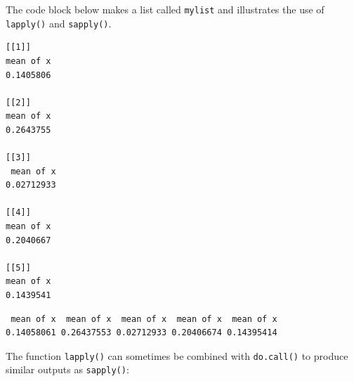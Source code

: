 \documentclass[
  13,
  letterpaper,
]{report}
\newenvironment{Shaded}{\begin{snugshade}}{\end{snugshade}}
\newcommand{\CommentTok}[1]{\textcolor[rgb]{0.37,0.37,0.37}{#1}}
\newcommand{\ControlFlowTok}[1]{\textcolor[rgb]{0.00,0.23,0.31}{\textbf{#1}}}
\newcommand{\DecValTok}[1]{\textcolor[rgb]{0.68,0.00,0.00}{#1}}
\newcommand{\FunctionTok}[1]{\textcolor[rgb]{0.28,0.35,0.67}{#1}}
\newcommand{\NormalTok}[1]{\textcolor[rgb]{0.00,0.23,0.31}{#1}}
\newcommand{\OtherTok}[1]{\textcolor[rgb]{0.00,0.23,0.31}{#1}}
\newcommand{\SpecialCharTok}[1]{\textcolor[rgb]{0.37,0.37,0.37}{#1}}
\newcommand{\StringTok}[1]{\textcolor[rgb]{0.13,0.47,0.30}{#1}}
\begin{document}
The code block below makes a list called \texttt{mylist} and illustrates
the use of \texttt{lapply()} and \texttt{sapply()}.

\begin{Shaded}
\end{Shaded}

\begin{verbatim}
[[1]]
mean of x 
0.1405806 

[[2]]
mean of x 
0.2643755 

[[3]]
 mean of x 
0.02712933 

[[4]]
mean of x 
0.2040667 

[[5]]
mean of x 
0.1439541 
\end{verbatim}

\begin{Shaded}
\end{Shaded}

\begin{verbatim}
 mean of x  mean of x  mean of x  mean of x  mean of x 
0.14058061 0.26437553 0.02712933 0.20406674 0.14395414 
\end{verbatim}

The function \texttt{lapply()} can sometimes be combined with
\texttt{do.call()} to produce similar outputs as \texttt{sapply()}:
\end{document}

